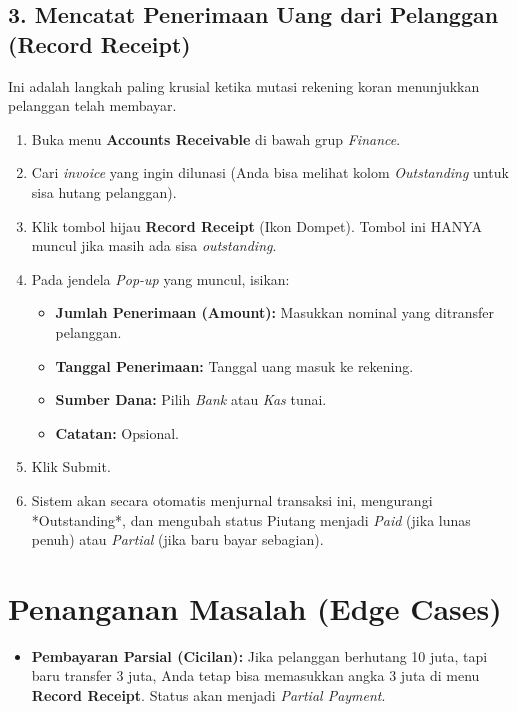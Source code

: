 \subsection{3. Mencatat Penerimaan Uang dari Pelanggan (Record Receipt)}
Ini adalah langkah paling krusial ketika mutasi rekening koran menunjukkan pelanggan telah membayar.
\begin{enumerate}
    \item Buka menu \textbf{Accounts Receivable} di bawah grup \textit{Finance}.
    \item Cari \textit{invoice} yang ingin dilunasi (Anda bisa melihat kolom \textit{Outstanding} untuk sisa hutang pelanggan).
    \item Klik tombol hijau \textbf{Record Receipt} (Ikon Dompet). Tombol ini HANYA muncul jika masih ada sisa \textit{outstanding}.
    \item Pada jendela \textit{Pop-up} yang muncul, isikan:
    \begin{itemize}
        \item \textbf{Jumlah Penerimaan (Amount):} Masukkan nominal yang ditransfer pelanggan.
        \item \textbf{Tanggal Penerimaan:} Tanggal uang masuk ke rekening.
        \item \textbf{Sumber Dana:} Pilih \textit{Bank} atau \textit{Kas} tunai.
        \item \textbf{Catatan:} Opsional.
    \end{itemize}
    \item Klik Submit.
    \item Sistem akan secara otomatis menjurnal transaksi ini, mengurangi *Outstanding*, dan mengubah status Piutang menjadi \textit{Paid} (jika lunas penuh) atau \textit{Partial} (jika baru bayar sebagian).
\end{enumerate}

\section{Penanganan Masalah (Edge Cases)}
\begin{itemize}
    \item \textbf{Pembayaran Parsial (Cicilan):} Jika pelanggan berhutang 10 juta, tapi baru transfer 3 juta, Anda tetap bisa memasukkan angka 3 juta di menu \textbf{Record Receipt}. Status akan menjadi \textit{Partial Payment}.
\end{itemize}
